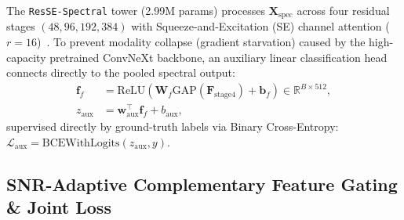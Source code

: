 \documentclass[10pt,twocolumn,letterpaper]{article}
\begin{document}
The \texttt{ResSE-Spectral} tower (2.99M params) processes $\mathbf{X}_{\mathrm{spec}}$ across four residual stages $(48, 96, 192, 384)$ with Squeeze-and-Excitation (SE) channel attention ($r = 16$)~\cite{hu2018squeeze}. To prevent modality collapse (gradient starvation) caused by the high-capacity pretrained ConvNeXt backbone, an auxiliary linear classification head connects directly to the pooled spectral output:
\begin{equation}
\label{eq:aux_head}
\begin{aligned}
\mathbf{f}_f &= \mathrm{ReLU}(\mathbf{W}_f \mathrm{GAP}(\mathbf{F}_{\mathrm{stage4}}) + \mathbf{b}_f) \in \mathbb{R}^{B \times 512}, \\
z_{\mathrm{aux}} &= \mathbf{w}_{\mathrm{aux}}^\top \mathbf{f}_f + b_{\mathrm{aux}},
\end{aligned}
\end{equation}
supervised directly by ground-truth labels via Binary Cross-Entropy: $\mathcal{L}_{\mathrm{aux}} = \mathrm{BCEWithLogits}(z_{\mathrm{aux}}, y)$.

\subsection{SNR-Adaptive Complementary Feature Gating \& Joint Loss}
\label{sec:method_gating}
\end{document}
